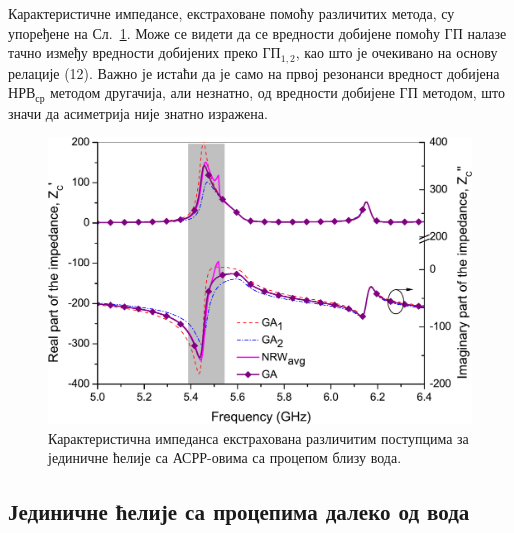Карактеристичне импедансе, екстраховане помоћу различитих метода, су упоређене на Сл.~\ref{fig7}. Може се видети да се вредности добијене помоћу $ГП$ налазе тачно између вредности добијених преко $ГП_{1,2}$, као што је очекивано на основу релације (12). Важно је истаћи да је само на првој резонанси вредност добијена $НРВ_{ср}$ методом другачија, али незнатно, од вредности добијене $ГП$ методом, што значи да асиметрија није знатно изражена.
\begin{figure}[!t]
\centering
\includegraphics[scale=\SkalaB]{slike/11a.pdf}
\caption{Карактеристична импеданса екстрахована различитим поступцима за јединичне ћелије са АСРР-овима са процепом близу вода.}
\label{fig7}
\end{figure} 

\subsection{Јединичне ћелије са процепима далеко од вода}

